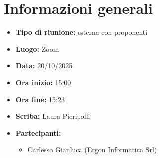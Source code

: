 \section{Informazioni generali}

\begin{itemize}
    \item \textbf{Tipo di riunione:} esterna con proponenti
    \item \textbf{Luogo:} Zoom
    \item \textbf{Data:} 20/10/2025
    \item \textbf{Ora inizio:} 15:00
    \item \textbf{Ora fine:} 15:23
    \item \textbf{Scriba:} Laura Pieripolli
    \item \textbf{Partecipanti:}
    \begin{itemize}
        \renewcommand{\labelitemii}{--}
        \item Carlesso Gianluca (Ergon Informatica Srl)
    \end{itemize}
\end{itemize}